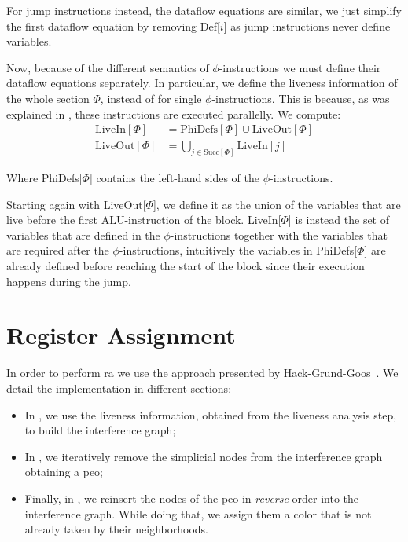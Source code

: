 For jump instructions instead, the dataflow equations are similar, we just simplify the first dataflow equation by removing Def[$i$] as jump instructions never define variables.

Now, because of the different semantics of $\phi$-instructions we must define their dataflow equations separately. In particular, we define the liveness information of the whole section $\Phi$, instead of for single $\phi$-instructions. This is because, as was explained in , these instructions are executed parallelly.
We compute:
\begin{align*}
  \text{LiveIn}[\Phi] &= \text{PhiDefs}[\Phi] \cup \text{LiveOut}[\Phi] \\
  \text{LiveOut}[\Phi] &= \bigcup \limits_{j \in \text{Succ}[\Phi]} \text{LiveIn}[j]
\end{align*}

Where PhiDefs[$\Phi$] contains the left-hand sides of the $\phi$-instructions.

Starting again with LiveOut[$\Phi$], we define it as the union of the variables that are live before the first ALU-instruction of the block. LiveIn[$\Phi$] is instead the set of variables that are defined in the $\phi$-instructions together with the variables that are required after the $\phi$-instructions, intuitively the variables in PhiDefs[$\Phi$] are already defined before reaching the start of the block since their execution happens during the jump.

\section{Register Assignment}
\label{sec:ra}


In order to perform \gls{ra} we use the approach presented by Hack-Grund-Goos~\cite{HGG:2006:RA-SSA}. We detail the implementation in different sections:
\begin{itemize}
  \item In , we use the liveness information, obtained from the liveness analysis step, to build the interference graph;
  \item In , we iteratively remove the simplicial nodes from the interference graph obtaining a \gls{peo};
  \item Finally, in , we reinsert the nodes of the \gls{peo} in \textit{reverse} order into the interference graph. While doing that, we assign them a color that is not already taken by their neighborhoods.
\end{itemize}

